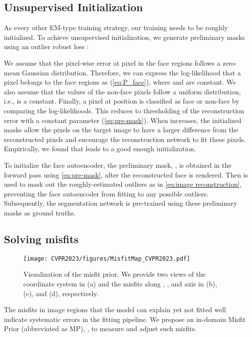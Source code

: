 \documentclass[10pt,twocolumn,letterpaper]{article}
\begin{document}
\subsection{Unsupervised Initialization}
\label{approach:initialization}
As every other EM-type training strategy, our training needs to be roughly initialized.
To achieve unsupervised initialization, we generate preliminary masks using an 
outlier robust loss \cite{egger2018occlusion}:

We assume that the pixel-wise error at pixel  in the face regions follows a zero-mean Gaussian distribution. Therefore, we can express the log-likelihood that a pixel belongs to the face regions as  (\cref{eq:P_face}), where  and  are constant. We also assume that the values of the non-face pixels follow a uniform distribution, i.e.,  is a constant. Finally, a pixel at position  is classified as face or non-face by comparing the log-likelihoods. This reduces to thresholding of the reconstruction error with a constant parameter  (\cref{eq:pre-mask}). 
When  increases, the initialized masks allow the pixels on the target image to have a larger difference from the reconstructed pixels and encourage the reconstruction network to fit these pixels. Empirically, we found that  leads to a good enough initialization. 

To initialize the face autoencoder, the preliminary mask, , is obtained in the forward pass using \cref{eq:pre-mask}, after the reconstructed face is rendered. Then  is used to mask out the roughly-estimated outliers as in \cref{eq:image reconstruction}, preventing the face autoencoder from fitting to any possible outliers.
Subsequently, the segmentation network is pre-trained using these preliminary masks as ground truths.


\subsection{Solving misfits}
\label{approach:prior}
\begin{figure}
  \centering
  \texttt{[image: CVPR2023/figures/MisfitMap\_CVPR2023.pdf]}
  \caption{Visualization of the misfit prior. We provide two views of the coordinate system in (a) and the misfits along , , and  axis in (b), (c), and (d), respectively.}
 \label{fig:misfit prior}
\end{figure}

The misfits in image regions that the model can explain yet not fitted well indicate systematic errors in the fitting pipeline. We propose an in-domain Misfit Prior (abbreviated as MP), , to measure and adjust such misfits. 
\end{document}
